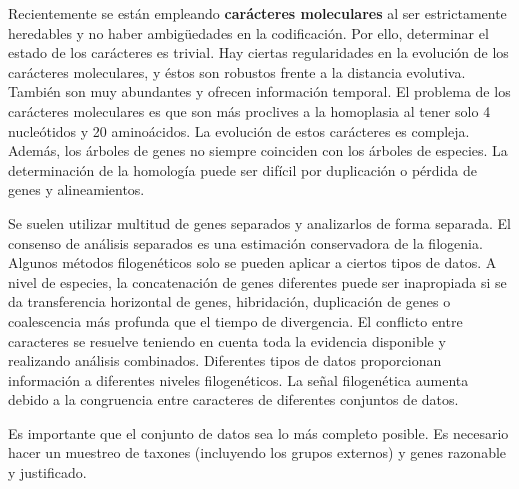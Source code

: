 Recientemente se están empleando \textbf{carácteres moleculares} al ser estrictamente heredables y no haber ambigüedades en la codificación. Por ello, determinar el estado de los carácteres es trivial. Hay ciertas regularidades en la evolución de los carácteres moleculares, y éstos son robustos frente a la distancia evolutiva. También son muy abundantes y ofrecen información temporal. El problema de los carácteres moleculares es que son más proclives a la homoplasia al tener solo 4 nucleótidos y 20 aminoácidos. La evolución de estos carácteres es compleja. Además, los árboles de genes no siempre coinciden con los árboles de especies. La determinación de la homología puede ser difícil por duplicación o pérdida de genes y alineamientos. 

Se suelen utilizar multitud de genes separados y analizarlos de forma separada. El consenso de análisis separados es una estimación conservadora de la filogenia. Algunos métodos filogenéticos solo se pueden aplicar a ciertos tipos de datos. A nivel de especies, la concatenación de genes diferentes puede ser inapropiada si se da transferencia horizontal de genes, hibridación, duplicación de genes o coalescencia más profunda que el tiempo de divergencia. El conflicto entre caracteres se resuelve teniendo en cuenta toda la evidencia disponible y realizando análisis combinados. Diferentes tipos de datos proporcionan información a diferentes niveles filogenéticos. La señal filogenética aumenta debido a la congruencia entre caracteres de diferentes conjuntos de datos. 

Es importante que el conjunto de datos sea lo más completo posible. Es necesario hacer un muestreo de taxones (incluyendo los grupos externos) y genes razonable y justificado. 
